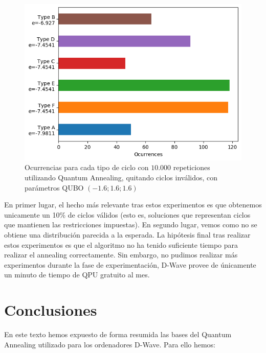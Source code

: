 \documentclass[11pt]{article}
\begin{document}
\begin{figure}[H]
	\includegraphics[scale=0.75]{figures/experiment3 (1.6).png}
	\centering
	\caption{Ocurrencias para cada tipo de ciclo con $10.000$ repeticiones utilizando Quantum Annealing, quitando ciclos inválidos, con parámetros QUBO $(-1.6; 1.6; 1.6)$}
	\label{fig:exp3-occ2}
\end{figure}

En primer lugar, el hecho más relevante tras estos experimentos es que obtenemos unicamente un 10\% de ciclos válidos (esto es, soluciones que representan ciclos que mantienen las restricciones impuestas). En segundo lugar, vemos como no se obtiene una distribución parecida a la esperada. La hipótesis final tras realizar estos experimentos es que el algoritmo no ha tenido suficiente tiempo para realizar el annealing correctamente. Sin embargo, no pudimos realizar más experimentos durante la fase de experimentación, D-Wave provee de únicamente un minuto de tiempo de QPU gratuito al mes.

\section{Conclusiones}

En este texto hemos expuesto de forma resumida las bases del Quantum Annealing utilizado para los ordenadores D-Wave. Para ello hemos:
\end{document}
